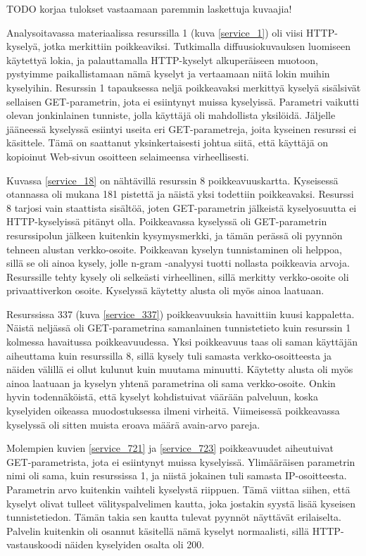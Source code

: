 TODO korjaa tulokset vastaamaan paremmin laskettuja kuvaajia!

Analysoitavassa materiaalissa resurssilla 1 (kuva \ref{service_1}) oli
viisi HTTP-kyselyä, jotka merkittiin poikkeaviksi. Tutkimalla
diffuusiokuvauksen luomiseen käytettyä lokia, ja palauttamalla
HTTP-kyselyt alkuperäiseen muotoon, pystyimme paikallistamaan nämä
kyselyt ja vertaamaan niitä lokin muihin kyselyihin. Resurssin 1
tapauksessa neljä poikkeavaksi merkittyä kyselyä sisälsivät sellaisen
GET-parametrin, jota ei esiintynyt muissa kyselyissä. Parametri
vaikutti olevan jonkinlainen tunniste, jolla käyttäjä oli mahdollista
yksilöidä. Jäljelle jääneessä kyselyssä esiintyi useita eri
GET-parametreja, joita kyseinen resurssi ei käsittele. Tämä on
saattanut yksinkertaisesti johtua siitä, että käyttäjä on kopioinut
Web-sivun osoitteen selaimeensa virheellisesti.

Kuvassa \ref{service_18} on nähtävillä resurssin 8 poikkeavuuskartta. Kyseisessä otannassa oli mukana 181 pistettä ja näistä yksi todettiin poikkeavaksi.
Resurssi 8 tarjosi vain staattista sisältöä, joten GET-parametrin jälkeistä kyselyosuutta ei HTTP-kyselyissä pitänyt olla. Poikkeavassa kyselyssä oli
GET-parametrin resurssipolun jälkeen kuitenkin kysymysmerkki, ja tämän perässä oli pyynnön tehneen alustan verkko-osoite. Poikkeavan kyselyn tunnistaminen
oli helppoa, sillä se oli ainoa kysely, jolle n-gram -analyysi tuotti
nollasta poikkeavia arvoja. Resurssille tehty kysely oli selkeästi virheellinen, sillä merkitty verkko-osoite 
oli privaattiverkon osoite. Kyselyssä käytetty alusta oli myös ainoa laatuaan.

Resurssissa 337 (kuva \ref{service_337}) poikkeavuuksia havaittiin kuusi kappaletta. Näistä neljässä oli GET-parametrina samanlainen tunnistetieto
kuin resurssin 1 kolmessa havaitussa poikkeavuudessa. Yksi poikkeavuus taas oli saman käyttäjän aiheuttama kuin resurssilla 8, sillä kysely tuli samasta
verkko-osoitteesta ja näiden välillä ei ollut kulunut kuin muutama
minuutti. Käytetty alusta oli myös ainoa laatuaan ja kyselyn yhtenä parametrina oli 
sama verkko-osoite. Onkin hyvin todennäköistä, että kyselyt
kohdistuivat väärään palveluun, koska kyselyiden oikeassa muodostuksessa ilmeni
virheitä. Viimeisessä poikkeavassa kyselyssä oli sitten muista eroava määrä avain-arvo pareja.

Molempien kuvien \ref{service_721} ja \ref{service_723} poikkeavuudet
aiheutuivat GET-parametrista, jota ei esiintynyt muissa
kyselyissä. Ylimääräisen parametrin nimi oli sama, kuin resurssissa 1,
ja niistä jokainen tuli samasta IP-osoitteesta. Parametrin arvo
kuitenkin vaihteli kyselystä riippuen. Tämä viittaa siihen, että
kyselyt olivat tulleet välityspalvelimen kautta, joka jostakin syystä
lisää kyseisen tunnistetiedon. Tämän takia sen kautta tulevat pyynnöt
näyttävät erilaiselta. Palvelin kuitenkin oli osannut käsitellä nämä
kyselyt normaalisti, sillä HTTP-\-vastauskoodi näiden kyselyiden
osalta oli 200.

